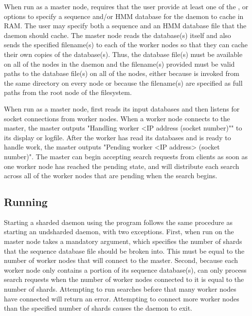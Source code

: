 \documentclass[notoc,justified]{tufte-book}    %
\begin{document}
When run as a master node,  requires that the user provide at least one of the , or  options to specify a sequence and/or HMM database for the daemon to cache in RAM.  The user may specify both a sequence and an HMM database file that the daemon should cache.  The master node reads the database(s) itself and also sends the specified filename(s) to each of the worker nodes so that they can cache their own copies of the database(s).  Thus, the database file(s) must be available on all of the nodes in the daemon and the filename(s) provided must be valid paths to the database file(s) on all of the nodes, either because  is invoked from the same directory on every node or because the filename(s) are specified as full paths from the root node of the filesystem.

When run as a master node,  first reads its input databases and then listens for socket connections from worker nodes.  When a worker node connects to the master, the master outputs  "Handling worker <IP address (socket number)"" to its display or logfile.  After the worker has read its databases and is ready to handle work, the master outputs "Pending worker <IP address> (socket number)".  The master can begin accepting search requests from clients as soon as one worker node has reached the pending state, and will distribute each search across all of the worker nodes that are pending when the search begins.


\subsection{Running }
Starting a sharded daemon using the  program follows the same procedure as starting an undsharded daemon, with two exceptions.  First, when run on the master node  takes a mandatory  argument, which specifies the number of shards that the sequence database file should be broken into.  This must be equal to the number of worker nodes that will connect to the master.  Second, because each worker node only contains a portion of its sequence database(s),  can only process search requests when the number of worker nodes connected to it is equal to the number of shards.  Attempting to run searches before that many worker nodes have connected will return an error.  Attempting to connect more worker nodes than the specified number of shards causes the daemon to exit.
\end{document}
